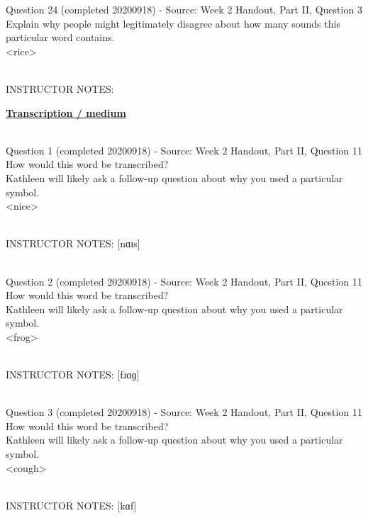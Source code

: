 \documentclass[12pt]{article}
\begin{document}
{\large Question 24} (completed 20200918) - Source: Week 2 Handout, Part II, Question 3\\

Explain why people might legitimately disagree about how many sounds this particular word contains.\\

<rice>


~\\
INSTRUCTOR NOTES: 


\newpage\textbf{\underline{\huge Transcription / medium\\}}

~\\

{\large Question 1} (completed 20200918) - Source: Week 2 Handout, Part II, Question 11\\

How would this word be transcribed?\\ Kathleen will likely ask a follow-up question about why you used a particular symbol.\\

<nice>


~\\
INSTRUCTOR NOTES: [nɑɪs]


~\\

{\large Question 2} (completed 20200918) - Source: Week 2 Handout, Part II, Question 11\\

How would this word be transcribed?\\ Kathleen will likely ask a follow-up question about why you used a particular symbol.\\

<frog>


~\\
INSTRUCTOR NOTES: [fɹɑɡ]


~\\

{\large Question 3} (completed 20200918) - Source: Week 2 Handout, Part II, Question 11\\

How would this word be transcribed?\\ Kathleen will likely ask a follow-up question about why you used a particular symbol.\\

<cough>


~\\
INSTRUCTOR NOTES: [kɑf]
\end{document}
